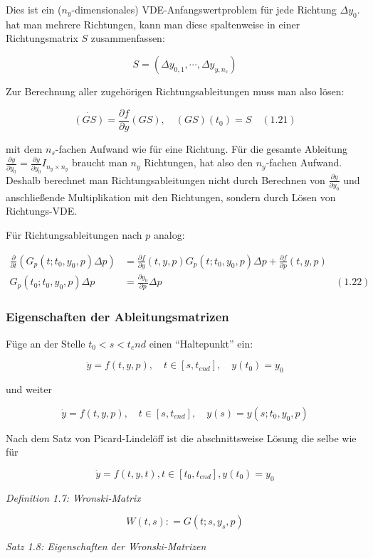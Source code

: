 Dies ist ein ($n_y$-dimensionales) VDE-Anfangswertproblem für jede Richtung $\Delta y_0$. hat man mehrere Richtungen, kann man diese spaltenweise in einer Richtungsmatrix $S$ zusammenfassen:

\[ S = ( \Delta y_{0,1}, \cdots, \Delta y_{y,n_s}) \]

Zur Berechnung aller zugehörigen Richtungsableitungen muss man also lösen:

\[ \dot{(GS)} = \frac{\partial f}{\partial y} (GS), \quad (GS)(t_0) = S \quad (1.21) \]

mit dem $n_s$-fachen Aufwand wie für eine Richtung. Für die gesamte Ableitung $\frac{\partial y}{\partial y_0} = \frac{\partial y}{\partial y_0} I_{n_y \times n_y}$ braucht man $n_y$ Richtungen, hat also den $n_y$-fachen Aufwand. Deshalb berechnet man Richtungsableitungen nicht durch Berechnen von $\frac{\partial y}{\partial y_0}$ und anschließende Multiplikation mit den Richtungen, sondern durch Lösen von Richtungs-VDE.

Für Richtungsableitungen nach $p$ analog:

\begin{align*}
\frac \partial{\partial t} (G_p(t;t_0,y_0,p) \Delta p) &= \frac{\partial f}{\partial y} (t,y,p) G_p(t;t_0,y_0,p) \Delta p + \frac{\partial f}{\partial p}(t,y,p) \\
G_p(t_0; t_0, y_0, p) \Delta p &= \frac{\partial y_0}{\partial p} \Delta p & (1.22) 
\end{align*}

\subsubsection*{Eigenschaften der Ableitungsmatrizen}

Füge an der Stelle $t_0 < s < t_end$ einen "`Haltepunkt"' ein:

\[\dot y = f(t,y,p),\quad t\in[s,t_{end}],\quad y(t_0) = y_0\]

und weiter

\[\dot y = f(t,y,p),\quad t\in[s,t_{end}],\quad y(s) = y(s; t_0, y_0, p) \]

Nach dem Satz von Picard-Lindelöff ist die abschnittsweise Lösung die selbe wie für

\[\dot y = f(t,y,t), t\in[t_0,t_{end}], y(t_0) = y_0 \]

\emph{Definition 1.7: Wronski-Matrix}

\[W(t,s) \colon= G(t; s, y_s, p) \]

\emph{Satz 1.8: Eigenschaften der Wronski-Matrizen}

